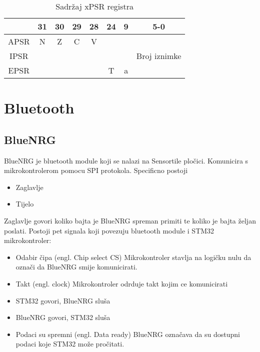 \documentclass[times, utf8, diplomski]{fer}
\begin{document}
\begin{table}[h]
  \begin{center}
    \begin{tabular}{c|c|c|c|c||c||c||c|}
      \cline{2-8} & 31 & 30 & 29 & 28 & 24 & 9 & 5-0\\
      \hline
      \multicolumn{1}{|c|}{APSR} & N & Z & C & V & \multicolumn{3}{c|}{ } \\
      \hline
      \multicolumn{1}{|c|}{IPSR} & \multicolumn{6}{c||}{ } & Broj iznimke \\
      \hline
      \multicolumn{1}{|c|}{EPSR} & \multicolumn{4}{c||}{ } & T & a & \\
      \hline
    \end{tabular}
    \caption{Sadr\v{z}aj xPSR registra}
  \end{center}
\end{table}

\newpage
\section{Bluetooth}
\subsection{BlueNRG}
BlueNRG je bluetooth module koji se nalazi na Sensortile plo\v{c}ici. Komunicira s mikrokontrolerom pomocu SPI protokola.
Specificno postoji
\begin{itemize}
  \item Zaglavlje
  \item Tijelo
\end{itemize}
Zaglavlje govori koliko bajta je BlueNRG spreman primiti te koliko je bajta \v{z}eljan poslati.
Postoji pet signala koji povezuju bluetooth module i STM32 mikrokontroler:

\begin{itemize}
  \item Odabir \v{c}ipa (engl. Chip select CS) Mikrokontroler stavlja na logi\v{c}ku nulu da ozna\v{c}i da BlueNRG smije komunicirati.
  \item Takt (engl. clock) Mikrokontroler odrduje takt kojim ce komunicirati
  \item STM32 govori, BlueNRG slu\v{s}a
  \item BlueNRG govori, STM32 slu\v{s}a
  \item Podaci su spremni (engl. Data ready) BlueNRG ozna\v{c}ava da su dostupni podaci koje STM32 mo\v{z}e pro\v{c}itati.
\end{itemize}
\end{document}
